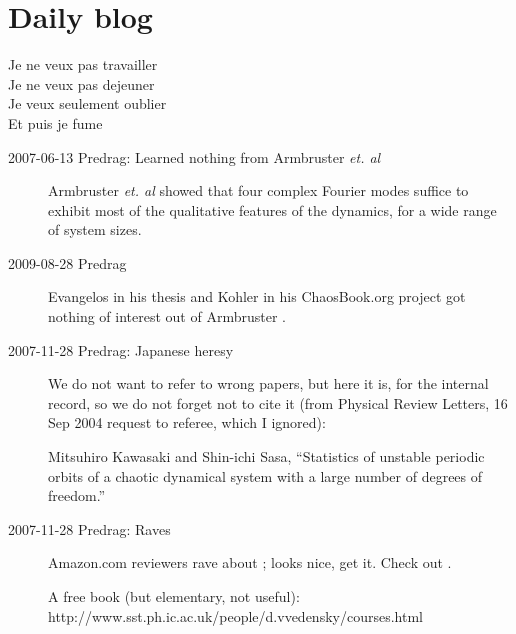
\chapter{Daily blog}
\label{c-DailyBlog}

\begin{bartlett}{
Je ne veux pas travailler\\
Je ne veux pas dejeuner\\
Je veux seulement oublier\\
Et puis je fume
            }
\end{bartlett}



\begin{description}

\item[2007-06-13 Predrag: Learned nothing from Armbruster {\em et. al}]
Armbruster {\em et. al} showed that four complex Fourier
modes suffice to exhibit most
of the qualitative features of the dynamics,
for a wide range of system sizes.

\item[2009-08-28 Predrag] Evangelos in his thesis and
Kohler in his
     {ChaosBook.org project}
got nothing of interest out of Armbruster \etal{}.

\item[2007-11-28 Predrag: Japanese heresy]
We do not want to refer to wrong papers, but here it is, for
the internal record, so we do not forget not to cite it
(from Physical Review Letters, 16 Sep 2004 request to referee,
which I ignored):

Mitsuhiro Kawasaki and Shin-ichi Sasa,
    ``Statistics of unstable periodic orbits of a chaotic dynamical system
    with a large number of degrees of freedom.''

\item[2007-11-28 Predrag: Raves]
Amazon.com reviewers rave about ;
looks nice, get it.
Check out
 .

A free book (but elementary, not useful):
\\
http://www.sst.ph.ic.ac.uk/people/d.vvedensky/courses.html

\end{description}


